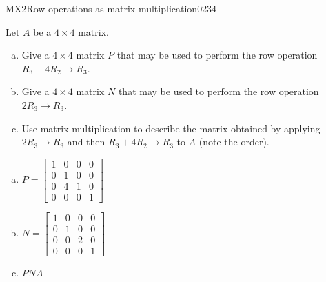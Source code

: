 \begin{exercise}{MX2}{Row operations as matrix multiplication}{0234} 
\begin{exerciseStatement} 

Let \(A\) be a \(4 \times 4\) matrix.

 

\begin{enumerate}[(a)]
\item Give a \(4 \times 4\) matrix \(P\) that may be used to perform the row operation \(R_3 + 4 R_2 \to R_3\).
\item Give a \(4 \times 4\) matrix \(N\) that may be used to perform the row operation \(2 R_3 \to R_3\).
\item Use matrix multiplication to describe the matrix obtained by applying \(2 R_3 \to R_3\) and then \(R_3 + 4 R_2 \to R_3\) to \(A\) (note the order). 
\end{enumerate}

     \end{exerciseStatement}
 \begin{exerciseAnswer} 

\begin{enumerate}[(a)]
\item \(P=\left[\begin{array}{cccc}
1 & 0 & 0 & 0 \\
0 & 1 & 0 & 0 \\
0 & 4 & 1 & 0 \\
0 & 0 & 0 & 1
\end{array}\right]\)
\item \(N=\left[\begin{array}{cccc}
1 & 0 & 0 & 0 \\
0 & 1 & 0 & 0 \\
0 & 0 & 2 & 0 \\
0 & 0 & 0 & 1
\end{array}\right]\)
\item  \(PNA\) 
\end{enumerate}

     \end{exerciseAnswer}
 \end{exercise}


\newpage





